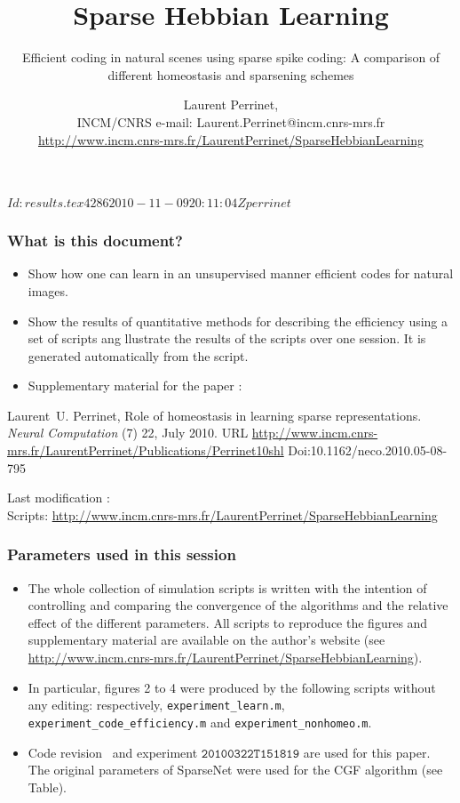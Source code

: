 \documentclass[a4]{beamer}%
\title{Sparse Hebbian Learning}%
\subtitle{Efficient coding in natural scenes using sparse spike coding: A comparison of different homeostasis and sparsening schemes}
\author{Laurent Perrinet, \\%
INCM/CNRS 
e-mail: Laurent.Perrinet@incm.cnrs-mrs.fr\\
\url{http://www.incm.cnrs-mrs.fr/LaurentPerrinet/SparseHebbianLearning}
}%
\begin{document}
\svnInfo $Id: results.tex 4286 2010-11-09 20:11:04Z perrinet $
\begin{frame}
\titlepage %
\end{frame}

\begin{frame}
\frametitle{What is this document?}%

\begin{itemize}
  \item Show how one can learn in an unsupervised manner efficient codes for natural images.
  \item Show the results of quantitative methods for describing the efficiency using a set of scripts ang llustrate the results of the scripts over one session. It is generated automatically from the script.
  \item Supplementary material for the paper :
\end{itemize}

{\tiny
%
\begin{thebibliography}{3}
Laurent~U. Perrinet,
\newblock Role of homeostasis in learning sparse representations.
\newblock \emph{Neural Computation} (7) 22, July 2010.
\newblock URL \url{http://www.incm.cnrs-mrs.fr/LaurentPerrinet/Publications/Perrinet10shl}
\newblock  Doi:10.1162/neco.2010.05-08-795
\end{thebibliography} 
}

Last modification : \svnId \\
Scripts: \url{http://www.incm.cnrs-mrs.fr/LaurentPerrinet/SparseHebbianLearning}

\end{frame}

\begin{frame}
\frametitle{Parameters used in this session}%

\begin{itemize}
  \item The whole collection of simulation scripts is written with the intention of controlling and comparing the convergence of the algorithms and the relative effect of the different parameters. All scripts to reproduce the figures and supplementary material are available on the author's website (see \url{http://www.incm.cnrs-mrs.fr/LaurentPerrinet/SparseHebbianLearning}). 
    \item In particular, figures 2 to 4 were produced by the following scripts without any editing: respectively, \texttt{experiment\_learn.m}, \texttt{experiment\_code\_efficiency.m} and \texttt{experiment\_nonhomeo.m}.
     \item  Code revision \svnInfoRevision\  and experiment $\mathtt{20100322T151819}$ are used for this paper. The original parameters of {\sc SparseNet} were used for the CGF algorithm (see Table).%
\end{itemize}
\end{frame}
\end{document}
